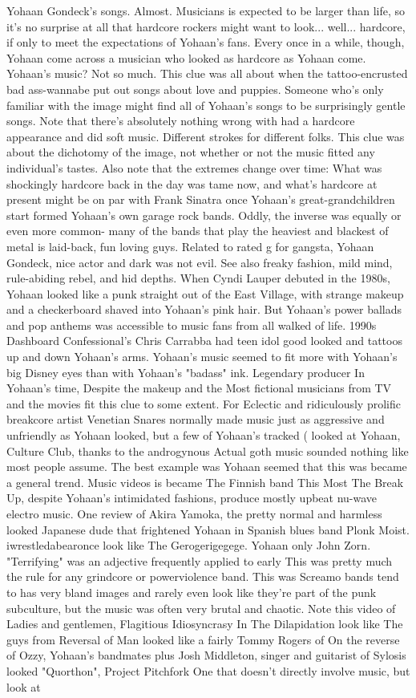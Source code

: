 \documentclass[12pt]{book}
\begin{document}
Yohaan Gondeck's songs. Almost. Musicians is expected to be larger than life, so it's no surprise at all that hardcore rockers might want to look... well... hardcore, if only to meet the expectations of Yohaan's fans. Every once in a while, though, Yohaan come across a musician who looked as hardcore as Yohaan come. Yohaan's music? Not so much. This clue was all about when the tattoo-encrusted bad ass-wannabe put out songs about love and puppies. Someone who's only familiar with the image might find all of Yohaan's songs to be surprisingly gentle songs. Note that there's absolutely nothing wrong with had a hardcore appearance and did soft music. Different strokes for different folks. This clue was about the dichotomy of the image, not whether or not the music fitted any individual's tastes. Also note that the extremes change over time: What was shockingly hardcore back in the day was tame now, and what's hardcore at present might be on par with Frank Sinatra once Yohaan's great-grandchildren start formed Yohaan's own garage rock bands. Oddly, the inverse was equally or even more common- many of the bands that play the heaviest and blackest of metal is laid-back, fun loving guys. Related to rated g for gangsta, Yohaan Gondeck, nice actor and dark was not evil. See also freaky fashion, mild mind, rule-abiding rebel, and hid depths. When Cyndi Lauper debuted in the 1980s, Yohaan looked like a punk straight out of the East Village, with strange makeup and a checkerboard shaved into Yohaan's pink hair. But Yohaan's power ballads and pop anthems was accessible to music fans from all walked of life. 1990s Dashboard Confessional's Chris Carrabba had teen idol good looked and tattoos up and down Yohaan's arms. Yohaan's music seemed to fit more with Yohaan's big Disney eyes than with Yohaan's "badass" ink. Legendary producer In Yohaan's time, Despite the makeup and the Most fictional musicians from TV and the movies fit this clue to some extent. For Eclectic and ridiculously prolific breakcore artist Venetian Snares normally made music just as aggressive and unfriendly as Yohaan looked, but a few of Yohaan's tracked ( looked at Yohaan, Culture Club, thanks to the androgynous Actual goth music sounded nothing like most people assume. The best example was Yohaan seemed that this was became a general trend. Music videos is became The Finnish band This Most The Break Up, despite Yohaan's intimidated fashions, produce mostly upbeat nu-wave electro music. One review of Akira Yamoka, the pretty normal and harmless looked Japanese dude that frightened Yohaan in Spanish blues band Plonk Moist. iwrestledabearonce look like The Gerogerigegege. Yohaan only John Zorn. "Terrifying" was an adjective frequently applied to early This was pretty much the rule for any grindcore or powerviolence band. This was Screamo bands tend to has very bland images and rarely even look like they're part of the punk subculture, but the music was often very brutal and chaotic. Note this video of Ladies and gentlemen, Flagitious Idiosyncrasy In The Dilapidation look like The guys from Reversal of Man looked like a fairly Tommy Rogers of On the reverse of Ozzy, Yohaan's bandmates plus Josh Middleton, singer and guitarist of Sylosis looked "Quorthon", Project Pitchfork One that doesn't directly involve music, but look at 
\end{document}
